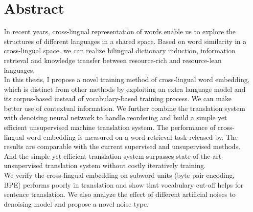 \chapter{Abstract}
In recent years, cross-lingual representation of words enable us to explore the structures of different languages in a shared space. Based on word similarity in a cross-lingual space. we can realize bilingual dictionary induction, information retrieval and knowledge transfer between resource-rich and resource-lean languages.\\
In this thesis, I propose a novel training method of cross-lingual word embedding, which is distinct from other methods by exploiting an extra language model and its corpus-based instead of vocabulary-based training process.
We can make better use of contextual information. We further combine the translation system with denoising neural network to handle reordering and build a simple yet efficient unsupervised machine translation system. The performance of cross-lingual word embedding is measured on a word retrieval task released by\cite{conneau2017word}. The results are comparable with the current supervised and unsupervised methods. And the simple yet efficient translation system surpasses state-of-the-art unsupervised translation system without costly iteratively training.\\
We verify the cross-lingual embedding on subword units (byte pair encoding, BPE) performs poorly in translation and show that vocabulary cut-off helps for sentence translation. We also analyze the effect of different artificial noises to denoising model and propose a novel noise type.


